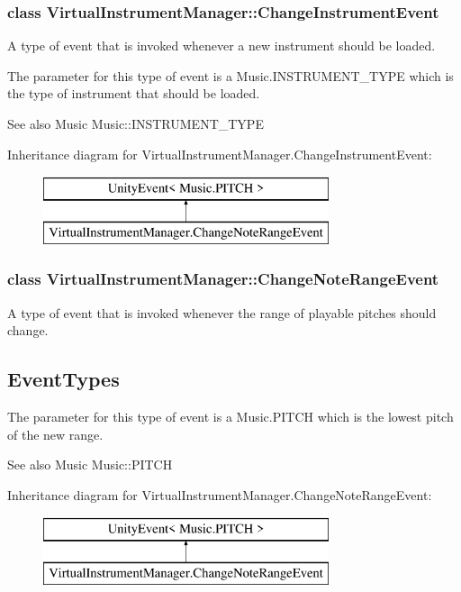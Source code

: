 \subsubsection{class Virtual\+Instrument\+Manager\+:\+:Change\+Instrument\+Event}
A type of event that is invoked whenever a new instrument should be loaded. 

The parameter for this type of event is a Music.\+I\+N\+S\+T\+R\+U\+M\+E\+N\+T\+\_\+\+T\+Y\+PE which is the type of instrument that should be loaded.

\begin{DoxySeeAlso}{See also}
Music Music\+::\+I\+N\+S\+T\+R\+U\+M\+E\+N\+T\+\_\+\+T\+Y\+PE 
\end{DoxySeeAlso}
Inheritance diagram for Virtual\+Instrument\+Manager.\+Change\+Instrument\+Event\+:\begin{figure}[H]
\begin{center}
\leavevmode
\includegraphics[height=2.000000cm]{group___virtual_instrument_manager}
\end{center}
\end{figure}
\label{class_virtual_instrument_manager_1_1_change_note_range_event}
\subsubsection{class Virtual\+Instrument\+Manager\+:\+:Change\+Note\+Range\+Event}
A type of event that is invoked whenever the range of playable pitches should change. 

\hypertarget{group___virtual_instrument_manager_EventTypes}{}\subsection{Event\+Types}\label{group___virtual_instrument_manager_EventTypes}
The parameter for this type of event is a Music.\+P\+I\+T\+CH which is the lowest pitch of the new range.

\begin{DoxySeeAlso}{See also}
Music Music\+::\+P\+I\+T\+CH 
\end{DoxySeeAlso}
Inheritance diagram for Virtual\+Instrument\+Manager.\+Change\+Note\+Range\+Event\+:\begin{figure}[H]
\begin{center}
\leavevmode
\includegraphics[height=2.000000cm]{group___virtual_instrument_manager}
\end{center}
\end{figure}
